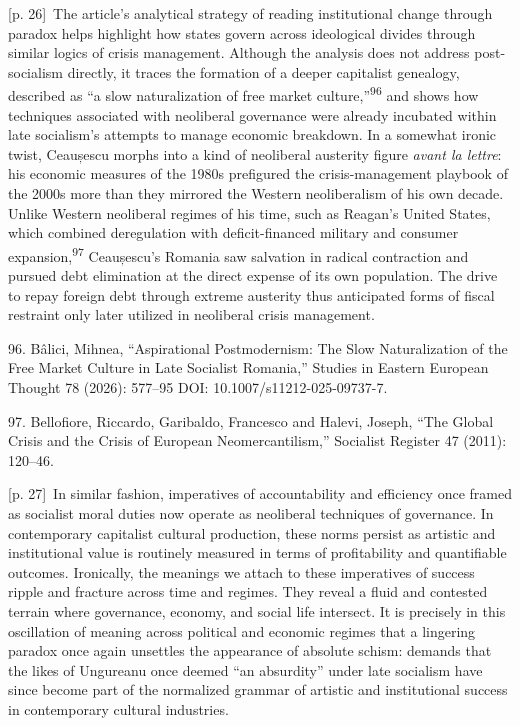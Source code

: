 \documentclass[10pt,a4paper]{article}
\begin{document}
{\scriptsize\color{gray} [p. 26]}\ The article’s analytical strategy of reading institutional change through paradox helps highlight how states govern across ideological divides through similar logics of crisis management. Although the analysis does not address post-socialism directly, it traces the formation of a deeper capitalist genealogy, described as “a slow naturalization of free market culture,”\nobreak\textsuperscript{96} and shows how techniques associated with neoliberal governance were already incubated within late socialism’s attempts to manage economic breakdown. In a somewhat ironic twist, Ceaușescu morphs into a kind of neoliberal austerity figure \textit{avant la lettre}: his economic measures of the 1980s prefigured the crisis-management playbook of the 2000s more than they mirrored the Western neoliberalism of his own decade. Unlike Western neoliberal regimes of his time, such as Reagan’s United States, which combined deregulation with deficit-financed military and consumer expansion,\nobreak\textsuperscript{97} Ceaușescu’s Romania saw salvation in radical contraction and pursued debt elimination at the direct expense of its own population. The drive to repay foreign debt through extreme austerity thus anticipated forms of fiscal restraint only later utilized in neoliberal crisis management.\par{\small 96. Bâlici, Mihnea, “Aspirational Postmodernism: The Slow Naturalization of the Free Market Culture in Late Socialist Romania,” Studies in Eastern European Thought 78 (2026): 577–95 DOI: 10.1007/s11212-025-09737-7.\par}{\small 97. Bellofiore, Riccardo, Garibaldo, Francesco and Halevi, Joseph, “The Global Crisis and the Crisis of European Neomercantilism,” Socialist Register 47 (2011): 120–46.\par}
{\scriptsize\color{gray} [p. 27]}\ In similar fashion, imperatives of accountability and efficiency once framed as socialist moral duties now operate as neoliberal techniques of governance. In contemporary capitalist cultural production, these norms persist as artistic and institutional value is routinely measured in terms of profitability and quantifiable outcomes. Ironically, the meanings we attach to these imperatives of success ripple and fracture across time and regimes. They reveal a fluid and contested terrain where governance, economy, and social life intersect. It is precisely in this oscillation of meaning across political and economic regimes that a lingering paradox once again unsettles the appearance of absolute schism: demands that the likes of Ungureanu once deemed “an absurdity” under late socialism have since become part of the normalized grammar of artistic and institutional success in contemporary cultural industries.\par
\end{document}
